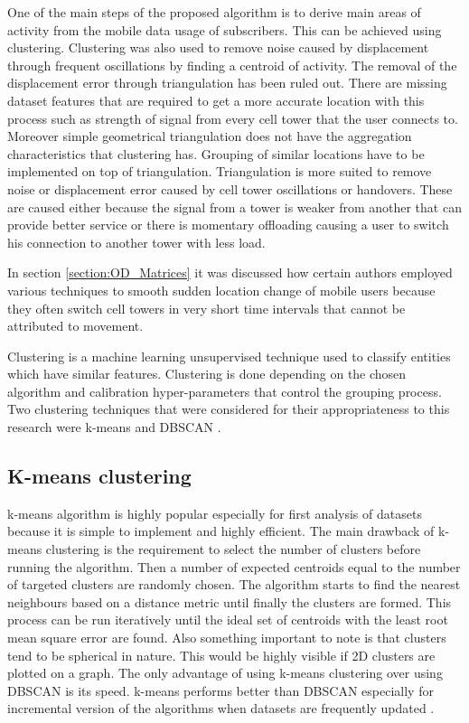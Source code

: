 \documentclass[12pt, a4paper]{report}
\theoremstyle{definition}
\theoremstyle{definition}%
\theoremstyle{definition}%
\theoremstyle{definition}%
\theoremstyle{definition}%
\theoremstyle{definition}%
\begin{document}
One of the main steps of the proposed algorithm is to derive main areas of activity from the mobile data usage of subscribers. This can be achieved using clustering. Clustering was also used to remove noise caused by displacement through frequent oscillations by finding a centroid of activity. The removal of the displacement error through triangulation has been ruled out. There are missing dataset features that are required to get a more accurate location with this process such as strength of signal from every cell tower that the user connects to. Moreover simple geometrical triangulation does not have the aggregation characteristics that clustering has. Grouping of similar locations have to be implemented on top of triangulation. Triangulation is more suited to remove noise or displacement error caused by cell tower oscillations or handovers. These are caused either because the signal from a tower is weaker from another that can provide better service or there is momentary offloading causing a user to switch his connection to another tower with less load. 

In section \ref{section:OD_Matrices} it was discussed how certain authors employed various techniques to smooth sudden location change of mobile users because they often switch cell towers in very short time intervals that cannot be attributed to movement. 

 
Clustering is a machine learning unsupervised technique used to classify entities which have similar features. Clustering is done depending on the chosen algorithm and calibration hyper-parameters that control the grouping process. Two clustering techniques that were considered for their appropriateness to this research were k-means and DBSCAN \cite{ChakrabortyNKNagwaniLopamudraDey2011,huang2017research}. 

\subsection{K-means clustering} \label{subsection:methodology:kmeans_clustering}
k-means algorithm is highly popular especially for first analysis of datasets because it is simple to implement and highly efficient. The main drawback of k-means clustering is the requirement to select the number of clusters before running the algorithm. Then a number of expected centroids equal to the number of targeted clusters are randomly chosen. The algorithm starts to find the nearest neighbours based on a distance metric until finally the clusters are formed. This process can be run iteratively until the ideal set of centroids with the least root mean square error are found. Also something important to note is that clusters tend to be spherical in nature. This would be highly visible if 2D clusters are plotted on a graph. The only advantage of using k-means clustering over using DBSCAN is its speed. k-means performs better than DBSCAN especially for incremental version of the algorithms when datasets are frequently updated \cite{ChakrabortyNKNagwaniLopamudraDey2011}.
\end{document}
